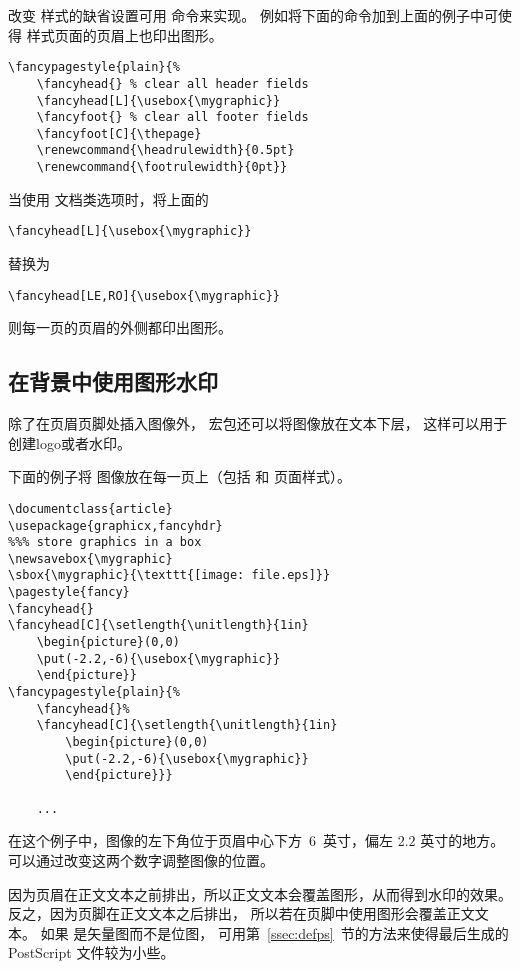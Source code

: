 改变  样式的缺省设置可用  命令来实现。
例如将下面的命令加到上面的例子中可使得  样式页面的页眉上也印出图形。

\begin{lstlisting}
\fancypagestyle{plain}{%
	\fancyhead{} % clear all header fields
	\fancyhead[L]{\usebox{\mygraphic}}
	\fancyfoot{} % clear all footer fields
	\fancyfoot[C]{\thepage}
	\renewcommand{\headrulewidth}{0.5pt}
	\renewcommand{\footrulewidth}{0pt}}
\end{lstlisting}

当使用 \opt{[twoside]} 文档类选项时，将上面的
\begin{lstlisting}
\fancyhead[L]{\usebox{\mygraphic}}
\end{lstlisting}
替换为
\begin{lstlisting}
\fancyhead[LE,RO]{\usebox{\mygraphic}}
\end{lstlisting}
则每一页的页眉的外侧都印出图形。


\subsection{在背景中使用图形水印}\label{ssec:watermark}

除了在页眉页脚处插入图像外， 宏包还可以将图像放在文本下层，
这样可以用于创建logo或者水印。

下面的例子将  图像放在每一页上（包括  和  页面样式）。
\begin{lstlisting}
\documentclass{article}
\usepackage{graphicx,fancyhdr}
%%% store graphics in a box
\newsavebox{\mygraphic}
\sbox{\mygraphic}{\texttt{[image: file.eps]}}
\pagestyle{fancy}
\fancyhead{}
\fancyhead[C]{\setlength{\unitlength}{1in}
	\begin{picture}(0,0)
	\put(-2.2,-6){\usebox{\mygraphic}}
	\end{picture}}
\fancypagestyle{plain}{%
	\fancyhead{}%
	\fancyhead[C]{\setlength{\unitlength}{1in}
		\begin{picture}(0,0)
		\put(-2.2,-6){\usebox{\mygraphic}}
		\end{picture}}}

	...

\end{lstlisting}
在这个例子中，图像的左下角位于页眉中心下方~6~英寸，偏左 $2.2$ 英寸的地方。
可以通过改变这两个数字调整图像的位置。

因为页眉在正文文本之前排出，所以正文文本会覆盖图形，从而得到水印的效果。
反之，因为页脚在正文文本之后排出，
所以若在页脚中使用图形会覆盖正文文本。
如果  是矢量图而不是位图，
可用第~\ref{ssec:defps}~节的方法来使得最后生成的 PostScript 文件较为小些。

